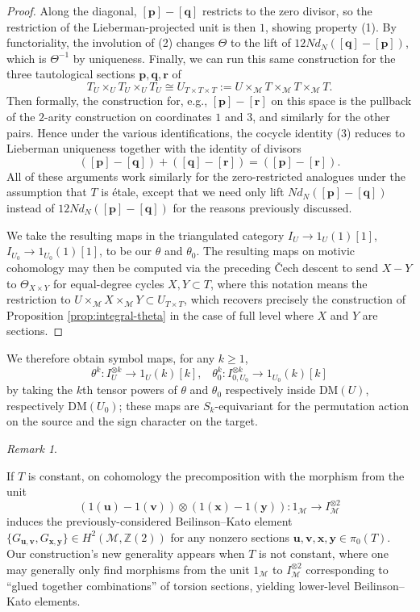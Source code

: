 \documentclass[a4paper,reqno,11pt]{amsart}
\theoremstyle{plain}
\theoremstyle{definition}
\theoremstyle{remark}
\newtheorem{remarkwr}[theorem]{Remark}
\newenvironment{remark}{\begin{remarkwr}\begin{upshape}}{\end{upshape}\end{remarkwr}}
\newcommand{\Z}{\mathbb{Z}}
\newcommand{\DM}{\mathrm{DM}}
\begin{document}
\begin{proof}
Along the diagonal, $[\mathbf p]-[\mathbf q]$ restricts to the zero divisor, so the restriction of the Lieberman-projected unit is then $1$, showing property (1). By functoriality, the involution of (2) changes $\Theta$ to the lift of $12Nd_N([\mathbf q]-[\mathbf p])$, which is $\Theta^{-1}$ by uniqueness. Finally, we can run this same construction for the three tautological sections $\mathbf p,\mathbf q,\mathbf r$ of 
\[
    T_U \times_U T_U \times_U T_U \cong U_{T\times T\times T}:= U\times_{\mathcal{M}} T \times_{\mathcal{M}} T \times_{\mathcal{M}}T.
\]
Then formally, the construction for, e.g., $[\mathbf p]-[\mathbf r]$ on this space is the pullback of the $2$-arity construction on coordinates $1$ and $3$, and similarly for the other pairs. Hence under the various identifications, the cocycle identity (3) reduces to Lieberman uniqueness together with the identity of divisors
\[
([\mathbf p]-[\mathbf q]) + ([\mathbf q]-[\mathbf r])= ([\mathbf p]-[\mathbf r]).
\]
All of these arguments work similarly for the zero-restricted analogues under the assumption that $T$ is \'{e}tale, except that we need only lift $Nd_N([\mathbf p]-[\mathbf q])$ instead of $12Nd_N([\mathbf p]-[\mathbf q])$ for the reasons previously discussed. 

We take the resulting maps in the triangulated category $I_U\to 1_U(1)[1]$, $I_{U_0}\to 1_{U_0}(1)[1]$, to be our $\theta$ and $\theta_0$. The resulting maps on motivic cohomology may then be computed via the preceding \v{C}ech descent to send $X-Y$ to $\Theta_{X\times Y}$ for equal-degree cycles $X,Y\subset T$, where this notation means the restriction to $U\times_{\mathcal{M}} X \times_{\mathcal{M}} Y \subset U_{T\times T}$, which recovers precisely the construction of Proposition \ref{prop:integral-theta} in the case of full level where $X$ and $Y$ are sections.
\end{proof}


We therefore obtain symbol maps, for any $k\ge 1$,
\[
\theta^{k}: I_U^{\otimes k} \to 1_U(k)[k], \;\;\;\theta_0^{k}: I_{0,U_0}^{\otimes k} \to 1_{U_0}(k)[k]
\]
by taking the $k$th tensor powers of $\theta$ and $\theta_0$ respectively inside $\DM(U)$, respectively $\DM(U_0)$; these maps are $S_k$-equivariant for the permutation action on the source and the sign character on the target.

\begin{remark}
If $T$ is constant, on cohomology the precomposition with the morphism from the unit 
\[
(1(\mathbf{u})-1(\mathbf{v})) \otimes (1(\mathbf{x})-1(\mathbf{y})) :1_{\mathcal{M}} \to I_{\mathcal{M}}^{\otimes 2}
\]
induces the previously-considered Beilinson--Kato element $\{G_{\mathbf{u},\mathbf{v}}, G_{\mathbf{x},\mathbf{y}}\}\in H^2(\mathcal{M},\Z(2))$ for any nonzero sections $\mathbf{u,v,x,y}\in \pi_0(T)$. Our construction's new generality appears when $T$ is not constant, where one may generally only find morphisms from the unit $1_{\mathcal{M}}$ to $I_{\mathcal{M}}^{\otimes 2}$ corresponding to ``glued together combinations'' of torsion sections, yielding lower-level Beilinson--Kato elements.
\end{remark}
\end{document}
